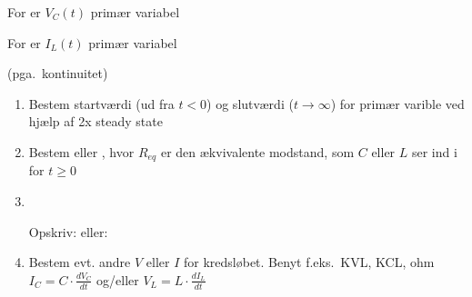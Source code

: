 For  er $V_C(t)$ primær variabel

For  er $I_L(t)$ primær variabel

(pga.\ kontinuitet)

\begin{enumerate}
    \item Bestem startværdi (ud fra $t<0$) og slutværdi ($t\rightarrow\infty$) for primær varible ved hjælp af 2x steady state
    \item Bestem  eller , hvor $R_{eq}$ er den ækvivalente modstand, som $C$ eller $L$ ser ind i for $t\ge0$
    \item \ 

	\parbox{5em}{Opskriv:\vskip 4pt eller:}\parbox{40em}{}
    \item Bestem evt. andre $V$ eller $I$ for kredsløbet. Benyt f.eks.\ KVL, KCL, ohm $I_C=C\cdot\frac{dV_C}{dt}$ og/eller $V_L=L\cdot\frac{dI_L}{dt}$ 
\end{enumerate}
